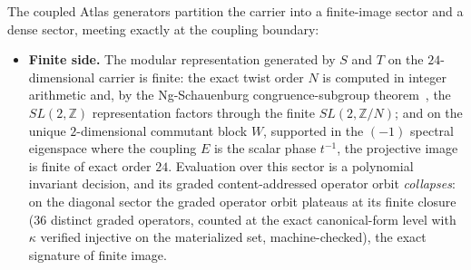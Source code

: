 \begin{theorem}
\label{thm:boundary}
The coupled Atlas generators partition the carrier into a finite-image sector and a dense sector, meeting exactly at the coupling boundary:
\begin{itemize}
\item \textbf{Finite side.} The modular representation generated by $S$ and $T$ on the $24$-dimensional carrier is finite: the exact twist order $N$ is computed in integer arithmetic and, by the Ng-Schauenburg congruence-subgroup theorem~\cite{ngschauenburg2010}, the $SL(2,\mathbb{Z})$ representation factors through the finite $SL(2,\mathbb{Z}/N)$; and on the unique $2$-dimensional commutant block $W$, supported in the $(-1)$ spectral eigenspace where the coupling $E$ is the scalar phase $t^{-1}$, the projective image is finite of exact order $24$. Evaluation over this sector is a polynomial invariant decision, and its graded content-addressed operator orbit \emph{collapses}: on the diagonal sector the graded operator orbit plateaus at its finite closure ($36$ distinct graded operators, counted at the exact canonical-form level with $\kappa$ verified injective on the materialized set, machine-checked), the exact signature of finite image.

\end{itemize}
\end{theorem}
